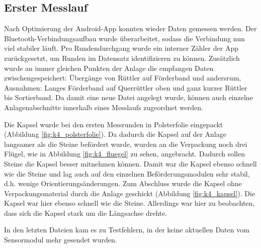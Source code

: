 \subsection{Erster Messlauf}

Nach Optimierung der Android-App konnten wieder Daten gemessen werden. Der Bluetooth-Verbindungsaufbau wurde überarbeitet, sodass die Verbindung nun viel stabiler läuft. Pro Rundendurchgang wurde ein interner Zähler der App zurückgesetzt, um Runden im Datensatz identifizieren zu können. Zusätzlich wurde an immer gleichen Punkten der Anlage die empfangen Daten zwischengespeichert: Übergänge von Rüttler auf Förderband und andersrum, Ausnahmen: Langes Förderband auf Querrüttler oben und ganz kurzer Rüttler bis Sortierband. Da damit eine neue Datei angelegt wurde, können auch einzelne Anlagenabschnitte innerhalb eines Messlaufs zugeordnet werden.

Die Kapsel wurde bei den ersten Messrunden in Polsterfolie eingepackt (Abbildung \ref{fig:k4_polsterfolie}). Da dadurch die Kapsel auf der Anlage langsamer als die Steine befördert wurde, wurden an die Verpackung noch drei Flügel, wie in Abbildung \ref{fig:k4_fluegel} zu sehen, angebracht. Dadurch sollen Steine die Kapsel besser mitnehmen können. Damit war die Kapsel ebenso schnell wie die Steine und lag auch auf den einzelnen Beförderungsmodulen sehr stabil, d.h. wenige Orientierungsänderungen. Zum Abschluss wurde die Kapsel ohne Verpackungsmaterial durch die Anlage geschickt (Abbildung \ref{fig:k4_kapsel}). Die Kapsel war hier ebenso schnell wie die Steine. Allerdings war hier zu beobachten, dass sich die Kapsel stark um die Längsachse drehte. 

In den letzten Dateien kam es zu Testfehlern, in der keine aktuellen Daten vom Sensormodul mehr gesendet wurden.

